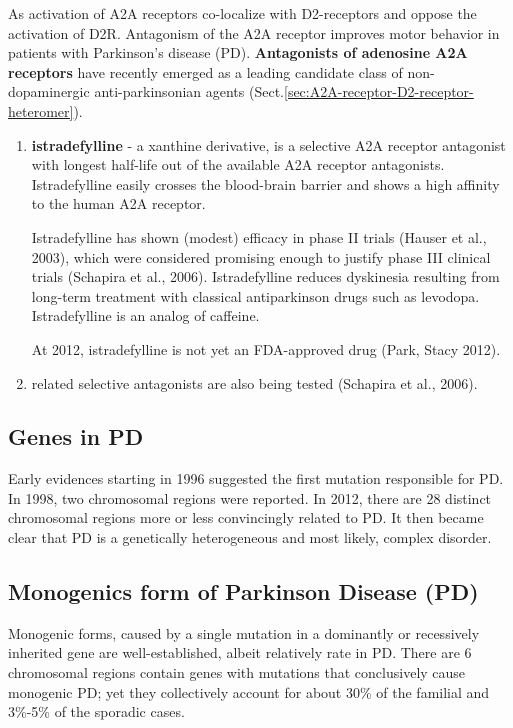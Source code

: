 As activation of A2A receptors co-localize with D2-receptors and oppose the
activation of D2R. Antagonism of the A2A receptor improves motor behavior in
patients with Parkinson's disease (PD). {\bf Antagonists of adenosine A2A
receptors} have recently emerged as a leading candidate class of non-
dopaminergic anti-parkinsonian agents
(Sect.\ref{sec:A2A-receptor-D2-receptor-heteromer}).
\begin{enumerate}
  \item  {\bf istradefylline} - a xanthine derivative, is a selective A2A
  receptor antagonist with longest half-life out of the available A2A receptor
  antagonists.  Istradefylline easily crosses the blood-brain barrier and shows
  a high affinity to the human A2A receptor.
  
  Istradefylline has shown (modest) efficacy in phase II trials (Hauser
  et al., 2003), which were considered promising enough to justify phase III
  clinical trials (Schapira et al., 2006).
  Istradefylline reduces dyskinesia resulting from long-term treatment with
  classical antiparkinson drugs such as levodopa. Istradefylline is an analog
  of caffeine. 
  
   
   At 2012, istradefylline is not yet an FDA-approved drug (Park, Stacy 2012).
   
   
  \item related selective antagonists are also being tested (Schapira et al., 2006).    
\end{enumerate}


\subsection{Genes in PD}

Early evidences starting in 1996 suggested the first mutation responsible for
PD.  In 1998, two chromosomal regions were reported. In 2012, there are 28
distinct chromosomal regions more or less convincingly related to PD. It then became
clear that PD is a genetically heterogeneous and most likely, complex disorder.

 
\subsection{Monogenics form of Parkinson Disease (PD)}

Monogenic forms, caused by a single mutation in a dominantly or recessively
inherited gene are well-established, albeit relatively rate in PD.
There are 6 chromosomal regions contain genes with mutations that conclusively
cause monogenic PD; yet they collectively account for about 30\% of the familial
and 3\%-5\% of the sporadic cases.


